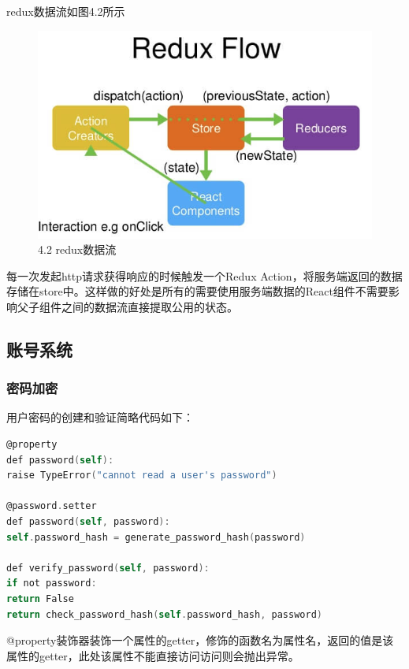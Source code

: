 redux数据流如图4.2所示

\begin{figure}[thbp!]
	\centering
	\includegraphics[width=1.0\linewidth]{figure/redux}
	\label{fig:redux} \\
		4.2 redux数据流
\end{figure}

每一次发起http请求获得响应的时候触发一个Redux Action，将服务端返回的数据存储在store中。这样做的好处是所有的需要使用服务端数据的React组件不需要影响父子组件之间的数据流直接提取公用的状态。

\subsection{账号系统}

\subsubsection{密码加密}

用户密码的创建和验证简略代码如下：

\begin{lstlisting}[language=C]
@property
def password(self):
raise TypeError("cannot read a user's password")

@password.setter
def password(self, password):
self.password_hash = generate_password_hash(password)

def verify_password(self, password):
if not password:
return False
return check_password_hash(self.password_hash, password)
\end{lstlisting}

@property装饰器装饰一个属性的getter，修饰的函数名为属性名，返回的值是该属性的getter，此处该属性不能直接访问访问则会抛出异常。

